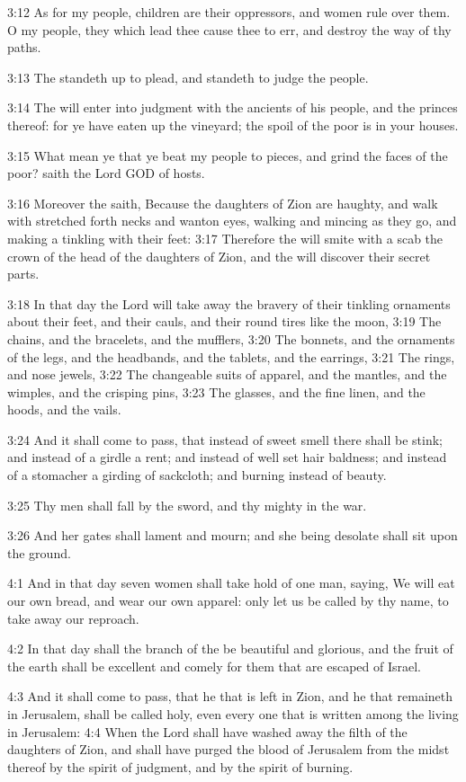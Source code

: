 3:12 As for my people, children are their oppressors, and women rule
over them. O my people, they which lead thee cause thee to err, and
destroy the way of thy paths.

3:13 The \LORD standeth up to plead, and standeth to judge the people.

3:14 The \LORD will enter into judgment with the ancients of his
people, and the princes thereof: for ye have eaten up the vineyard;
the spoil of the poor is in your houses.

3:15 What mean ye that ye beat my people to pieces, and grind the
faces of the poor? saith the Lord GOD of hosts.

3:16 Moreover the \LORD saith, Because the daughters of Zion are
haughty, and walk with stretched forth necks and wanton eyes, walking
and mincing as they go, and making a tinkling with their feet: 3:17
Therefore the \LORD will smite with a scab the crown of the head of the
daughters of Zion, and the \LORD will discover their secret parts.

3:18 In that day the Lord will take away the bravery of their tinkling
ornaments about their feet, and their cauls, and their round tires
like the moon, 3:19 The chains, and the bracelets, and the mufflers,
3:20 The bonnets, and the ornaments of the legs, and the headbands,
and the tablets, and the earrings, 3:21 The rings, and nose jewels,
3:22 The changeable suits of apparel, and the mantles, and the
wimples, and the crisping pins, 3:23 The glasses, and the fine linen,
and the hoods, and the vails.

3:24 And it shall come to pass, that instead of sweet smell there
shall be stink; and instead of a girdle a rent; and instead of well
set hair baldness; and instead of a stomacher a girding of sackcloth;
and burning instead of beauty.

3:25 Thy men shall fall by the sword, and thy mighty in the war.

3:26 And her gates shall lament and mourn; and she being desolate
shall sit upon the ground.

4:1 And in that day seven women shall take hold of one man, saying, We
will eat our own bread, and wear our own apparel: only let us be
called by thy name, to take away our reproach.

4:2 In that day shall the branch of the \LORD be beautiful and
glorious, and the fruit of the earth shall be excellent and comely for
them that are escaped of Israel.

4:3 And it shall come to pass, that he that is left in Zion, and he
that remaineth in Jerusalem, shall be called holy, even every one that
is written among the living in Jerusalem: 4:4 When the Lord shall have
washed away the filth of the daughters of Zion, and shall have purged
the blood of Jerusalem from the midst thereof by the spirit of
judgment, and by the spirit of burning.

